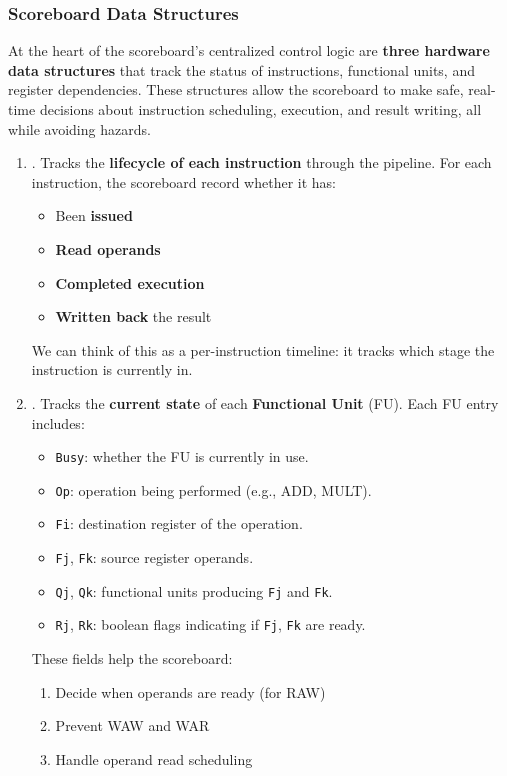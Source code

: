 \subsubsection{Scoreboard Data Structures}

At the heart of the scoreboard's centralized control logic are \textbf{three hardware data structures} that track the status of instructions, functional units, and register dependencies. These structures allow the scoreboard to make safe, real-time decisions about instruction scheduling, execution, and result writing, all while avoiding hazards.
\begin{enumerate}
    \item {}. Tracks the \textbf{lifecycle of each instruction} through the pipeline. For each instruction, the scoreboard record whether it has:
    \begin{itemize}
        \item Been \textbf{issued}
        \item \textbf{Read operands}
        \item \textbf{Completed execution}
        \item \textbf{Written back} the result
    \end{itemize}
    We can think of this as a per-instruction timeline: it tracks which stage the instruction is currently in.

    \item {}. Tracks the \textbf{current state} of each \textbf{Functional Unit} (FU). Each FU entry includes:
    \begin{itemize}
        \item \texttt{Busy}: whether the FU is currently in use.
        \item \texttt{Op}: operation being performed (e.g., ADD, MULT).
        \item \texttt{Fi}: destination register of the operation.
        \item \texttt{Fj}, \texttt{Fk}: source register operands.
        \item \texttt{Qj}, \texttt{Qk}: functional units producing \texttt{Fj} and \texttt{Fk}.
        \item \texttt{Rj}, \texttt{Rk}: boolean flags indicating if \texttt{Fj}, \texttt{Fk} are ready.
    \end{itemize}
    These fields help the scoreboard:
    \begin{enumerate}
        \item Decide when operands are ready (for RAW)
        \item Prevent WAW and WAR
        \item Handle operand read scheduling
    \end{enumerate}


\end{enumerate}
